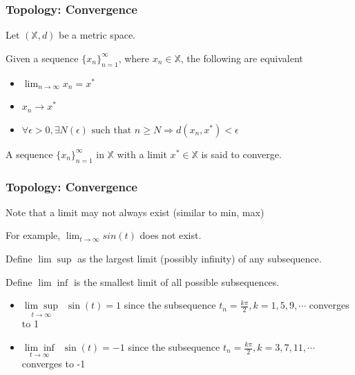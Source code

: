 \documentclass{beamer}
\begin{document}
\begin{frame}\frametitle{Topology: Convergence}

Let $(\mathbb{X},d)$ be a metric space.

\begin{definition}[Convergence] Given a sequence $\{x_n\}_{n=1}^\infty$, where $x_n\in\mathbb{X}$, the following are equivalent
\begin{itemize}
  \item $\lim_{n \to \infty} x_n = x^*$
  \item $x_n \rightarrow x^*$
  \item $\forall \epsilon > 0, \exists N(\epsilon) \text{ such that } n \geq N \Rightarrow d(x_n,x^*) < \epsilon$
\end{itemize}
A sequence $\{x_n\}_{n=1}^\infty$ in $\mathbb{X}$ with a limit $x^\ast \in \mathbb{X}$ is said to converge.
\end{definition}
\end{frame}

\begin{frame}\frametitle{Topology: Convergence}

Note that a limit may not always exist (similar to min, max)
    
    For example, $\lim_{t\to\infty}sin(t)$ does not exist. \\
   
\begin{definition}[$\lim\sup$] Define $\lim \sup$ as the largest limit (possibly infinity) of any subsequence.	
\end{definition}
\begin{definition}[$\lim\inf$]
Define $\lim \inf$ is the smallest limit of all possible subsequences.
\end{definition}

\begin{example}
\begin{itemize}
\item $\underset{t\to\infty}{\lim\sup} \enspace \sin(t) = 1 $ since the subsequence $t_n = \frac{k\pi}{2}, k = 1,5,9,\cdots$ converges to 1
\item $\underset{t\to\infty}{\lim\inf} \enspace \sin(t) = -1 $ since the subsequence $t_n = \frac{k\pi}{2}, k = 3,7,11,\cdots$ converges to -1
\end{itemize}
\end{example}
\end{frame}
\end{document}
